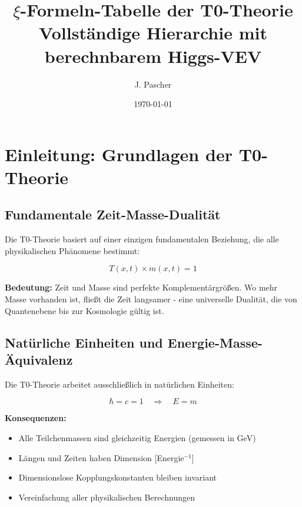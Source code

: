 \documentclass[12pt,a4paper]{article}
\begin{document}
	
	\title{\textbf{\(\xi\)-Formeln-Tabelle der T0-Theorie}\\
		\large Vollständige Hierarchie mit berechnbarem Higgs-VEV}
	
	\author{J. Pascher}
	\date{\today}
	
	\maketitle
	\maketitle
	
	\section{Einleitung: Grundlagen der T0-Theorie}
	
	\subsection{Fundamentale Zeit-Masse-Dualität}
	
	Die T0-Theorie basiert auf einer einzigen fundamentalen Beziehung, die alle physikalischen Phänomene bestimmt:
	
	\begin{equation}
		\boxed{T(x,t) \times m(x,t) = 1}
	\end{equation}
	
	\textbf{Bedeutung:} Zeit und Masse sind perfekte Komplementärgrößen. Wo mehr Masse vorhanden ist, fließt die Zeit langsamer - eine universelle Dualität, die von Quantenebene bis zur Kosmologie gültig ist.
	
	\subsection{Natürliche Einheiten und Energie-Masse-Äquivalenz}
	
	Die T0-Theorie arbeitet ausschließlich in natürlichen Einheiten:
	
	\begin{equation}
		\boxed{\hbar = c = 1 \quad \Rightarrow \quad E = m}
	\end{equation}
	
	\textbf{Konsequenzen:}
	\begin{itemize}
		\item Alle Teilchenmassen sind gleichzeitig Energien (gemessen in GeV)
		\item Längen und Zeiten haben Dimension [Energie$^{-1}$]
		\item Dimensionslose Kopplungskonstanten bleiben invariant
		\item Vereinfachung aller physikalischen Berechnungen
	\end{itemize}
	
\end{document}
